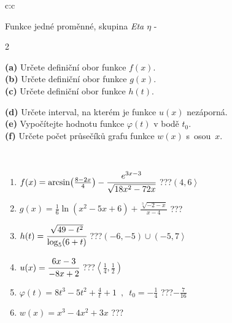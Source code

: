 \documentclass[10pt]{report}
\begin{document}
\begin{tabular}{c:c}
\begin{minipage}[c][104.5mm][t]{0.5\linewidth}
\begin{center}
\vspace{7mm}
{\huge Funkce jedné proměnné, skupina \textit{Eta $\eta$} -}\\[5mm]
\begin{minipage}{0.95\linewidth}
\begin{center}
{\small \begin{multicols}{2} \raggedright
\textbf{(a)} Určete definiční obor funkce \(f(x)\). \\[1mm]
\textbf{(b)} Určete definiční obor funkce \(g(x)\). \\[1mm]
\textbf{(c)} Určete definiční obor funkce \(h(t)\). \par \columnbreak
\textbf{(d)} Určete interval, na kterém je funkce \(u(x)\) nezáporná. \\[1mm]
\textbf{(e)} Vypočítejte hodnotu funkce \(\varphi(t)\) v bodě \(t_0\). \\[1mm]
\textbf{(f)} Určete počet průsečíků grafu funkce \(w(x)\) s~osou~\(x\). \\[1mm]
\end{multicols}
}
\end{center}
\end{minipage}
\\[4mm]
\begin{minipage}{0.79\linewidth}
\begin{center}
\begin{varwidth}{\linewidth}
\begin{enumerate}
\small
\item $f(x) = \arcsin\!\left( \frac{8-2x}{4} \right) - \cfrac{e^{3x-3}}{\sqrt{18x^2-72x}}$\quad \dotfill\; ???\;\dotfill \quad $\left(4 , 6\right\rangle$
\item $g(x) = \frac{1}{6} \ln{\!(x^2-5x+6)}+\frac{\sqrt[3]{-2-x}}{x-4}$\quad \dotfill\; ???\;\dotfill {}
\item $h(t) = \cfrac{\sqrt{49-t^2}}{\log_5(6+t)}$\quad \dotfill\; ???\;\dotfill \quad $\left(-6 , -5\right)\cup\left(-5 , 7\right\rangle$
\item $u(x) = \cfrac{6x-3}{-8x+2}$\quad \dotfill\; ???\;\dotfill \quad $\left\langle\frac{1}{4} , \frac{1}{2}\right)$
\item $\varphi(t) = 8t^3-5t^2+\frac{4}{t}+1 \enspace , \enspace t_0=-\frac{1}{4}$\quad \dotfill\; ???\;\dotfill \quad $-\frac{7}{16}$
\item $w(x) = x^3-4x^2+3x$\quad \dotfill\; ???\;\dotfill {}

\end{enumerate}
\end{varwidth}
\end{center}
\end{minipage}
\end{center}
\end{minipage}
\end{tabular}
\end{document}
